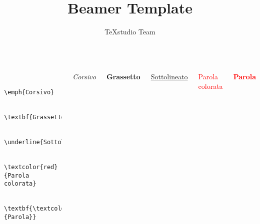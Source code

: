 \documentclass{beamer}
\title{Beamer Template}
\author{TeXstudio Team}
\begin{document}
\begin{frame}[plain]
    \maketitle
\end{frame}

\begin{frame}[fragile]
	
	\begin{columns}[T]
		
		\begin{verbatim}
			
			\emph{Corsivo}
			
			\textbf{Grassetto}
			
			\underline{Sottolineato}
			
			\textcolor{red}{Parola colorata}
			
			\textbf{\textcolor{red}{Parola}}
			
		\end{verbatim}
	
	\centering
	
	\vspace{5mm}
		\emph{Corsivo}
	\vspace{5mm}
	
	\textbf{Grassetto}
	\vspace{5mm}
	
	\underline{Sottolineato}
	\vspace{5mm}
	
	\textcolor{red}{Parola colorata}
	\vspace{5mm}
	
	\textbf{\textcolor{red}{Parola}}
	\end{columns}
	
	
\end{frame}
\end{document}
